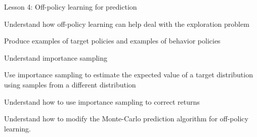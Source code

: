 \documentclass[lang=en,mode=geye,device=normal,color=blue,14pt]{elegantnote}
\DeclareMathOperator*{\1}{\mathbbm{1}}
\begin{document}
Lesson 4: Off-policy learning for prediction 

Understand how off-policy learning can help deal with the exploration problem 

Produce examples of target policies and examples of behavior policies

Understand importance sampling 

Use importance sampling to estimate the expected value of a target distribution using samples from a different distribution

Understand how to use importance sampling to correct returns 

Understand how to modify the Monte-Carlo prediction algorithm for off-policy learning.






\end{document}
